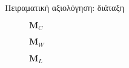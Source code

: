 \begin{frame}{Πειραματική αξιολόγηση: διάταξη}

\begin{minipage}{\linewidth}
  \begin{minipage}{0.3\linewidth}
    \begin{figure}
      
      \vspace{0.5cm}
      \caption{\small $\bm{M}_C$}
    \end{figure}
  \end{minipage}
  \begin{minipage}{0.3\linewidth}
    \begin{figure}
      
      \vspace{0.25cm}
      \caption{\small $\bm{M}_W$}
    \end{figure}
  \end{minipage}
  \begin{minipage}{0.3\linewidth}
    \begin{figure}
      
      \caption{\small $\bm{M}_L$}
    \end{figure}
  \end{minipage}
\end{minipage}

\end{frame}

